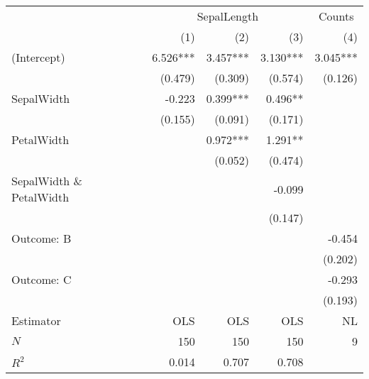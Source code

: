 \begin{tabular}{lrrrr}
\toprule
                         & \multicolumn{3}{c}{SepalLength} & \multicolumn{1}{c}{Counts} \\ 
\cmidrule(lr){2-4} \cmidrule(lr){5-5} 
                         &      (1) &      (2) &       (3) &                        (4) \\ 
\midrule
(Intercept)              & 6.526*** & 3.457*** &  3.130*** &                   3.045*** \\ 
                         &  (0.479) &  (0.309) &   (0.574) &                    (0.126) \\ 
SepalWidth               &   -0.223 & 0.399*** &   0.496** &                            \\ 
                         &  (0.155) &  (0.091) &   (0.171) &                            \\ 
PetalWidth               &          & 0.972*** &   1.291** &                            \\ 
                         &          &  (0.052) &   (0.474) &                            \\ 
SepalWidth \& PetalWidth &          &          &    -0.099 &                            \\ 
                         &          &          &   (0.147) &                            \\ 
Outcome: B               &          &          &           &                     -0.454 \\ 
                         &          &          &           &                    (0.202) \\ 
Outcome: C               &          &          &           &                     -0.293 \\ 
                         &          &          &           &                    (0.193) \\ 
\midrule
Estimator                &      OLS &      OLS &       OLS &                         NL \\ 
\midrule
$N$                      &      150 &      150 &       150 &                          9 \\ 
$R^2$                    &    0.014 &    0.707 &     0.708 &                            \\ 
\bottomrule
\end{tabular}

